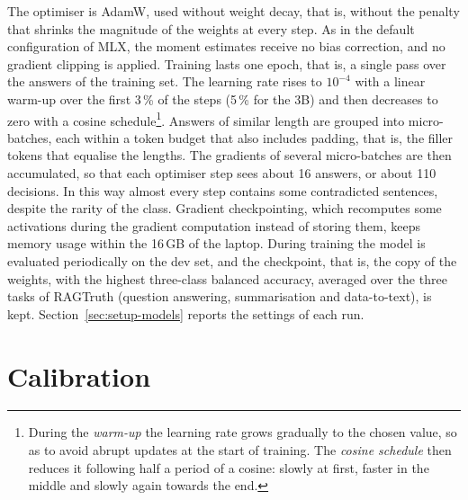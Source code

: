 The optimiser is AdamW, used without weight decay, that is, without the penalty that shrinks the magnitude of the
weights at every step. As in the default configuration of MLX, the moment estimates receive no bias correction, and no
gradient clipping is applied. Training lasts one epoch, that is, a single pass over the answers of the training set.
The learning rate rises to $10^{-4}$ with a linear warm-up over the first 3\,\% of the steps (5\,\% for the 3B) and then decreases to zero
with a cosine schedule\footnote{During the \emph{warm-up} the learning rate grows gradually to the chosen value, so as
to avoid abrupt updates at the start of training. The \emph{cosine schedule} then reduces it following half a period of
a cosine: slowly at first, faster in the middle and slowly again towards the end.}. Answers of similar length are
grouped into micro-batches, each within a token budget that also includes padding, that is, the filler tokens that
equalise the lengths. The gradients of several micro-batches are then accumulated, so that each optimiser step sees
about 16 answers, or about 110 decisions. In this way almost every step contains some contradicted sentences, despite the
rarity of the class. Gradient checkpointing, which recomputes some activations during the gradient computation instead
of storing them, keeps memory usage within the 16\,GB of the laptop.
During training the model is evaluated periodically on the dev set, and the checkpoint, that is, the copy of the
weights, with the highest three-class balanced accuracy, averaged over the three tasks of RAGTruth (question answering, summarisation and data-to-text), is kept. Section~\ref{sec:setup-models} reports
the settings of each run.

\section{Calibration}
\label{sec:method-calibration}

